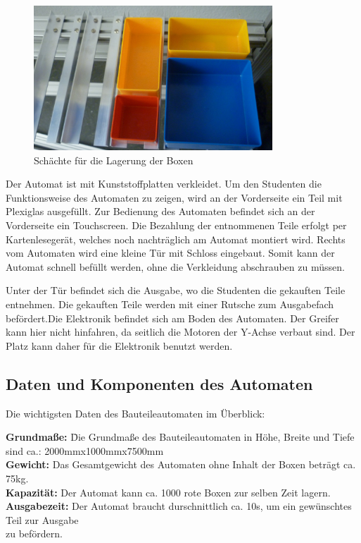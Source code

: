 \begin{figure}
  \centering
     \includegraphics[width=0.8\textwidth]{Bilder/Schacht.jpg}
			\caption{Schächte für die Lagerung der Boxen}
  \label{fig:Bild1}
\end{figure}

Der Automat ist mit Kunststoffplatten verkleidet. Um den Studenten die Funktionsweise des Automaten zu zeigen, wird an der 
Vorderseite ein Teil mit Plexiglas ausgefüllt. Zur Bedienung des Automaten befindet sich an der Vorderseite ein Touchscreen.  Die Bezahlung der entnommenen Teile erfolgt per Kartenlesegerät, welches noch nachträglich am Automat montiert wird. Rechts vom Automaten wird eine kleine Tür mit Schloss eingebaut. Somit kann der Automat schnell befüllt werden, ohne die Verkleidung abschrauben zu müssen. 

Unter der Tür befindet sich die Ausgabe, wo die Studenten die gekauften Teile entnehmen. Die gekauften Teile werden mit einer Rutsche zum Ausgabefach befördert.Die Elektronik befindet sich am Boden des Automaten. Der Greifer kann hier nicht hinfahren, da seitlich die Motoren der Y-Achse verbaut sind. Der Platz kann daher für die Elektronik benutzt werden.




\newpage
\subsection{Daten und Komponenten des Automaten}

Die wichtigsten Daten des Bauteileautomaten im Überblick:

\begin{tabbing}
\textbf{Grundmaße:} \quad    \=Die Grundmaße des Bauteileautomaten in Höhe, Breite und Tiefe\\
											  \>sind ca.: 2000mmx1000mmx7500mm\\
\textbf{Gewicht:}			  \>Das Gesamtgewicht des Automaten ohne Inhalt der Boxen beträgt ca. 75kg.\\
\textbf{Kapazität:}		  \>Der Automat kann ca. 1000 rote Boxen zur selben Zeit lagern.\\
\textbf{Ausgabezeit:}	  \>Der Automat braucht durschnittlich ca. 10s, um ein gewünschtes Teil zur Ausgabe\\
												\>zu befördern.\\

\end{tabbing}

